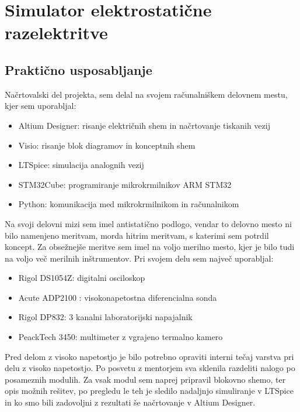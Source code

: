 \documentclass[a4paper,twoside,openright,12pt,Slovene]{book}
\begin{document}
\chapter{Simulator elektrostatične razelektritve} \label{ESDSIM}

	\section{Praktično usposabljanje}
	Načrtovalski del projekta, sem delal na svojem računalniškem delovnem mestu, kjer sem uporabljal:
	\begin{itemize}
		\item Altium Designer: risanje električnih shem in načrtovanje tiskanih vezij
		\item Visio: risanje blok diagramov in konceptnih shem
		\item LTSpice: simulacija analognih vezij
		\item STM32Cube: programiranje mikrokrmilnikov ARM STM32
		\item Python: komunikacija med mikrokrmilnikom in računalnikom
	\end{itemize}
	Na svoji delovni mizi sem imel antistatično podlogo, vendar to delovno mesto ni bilo namenjeno meritvam, morda hitrim meritvam, s katerimi sem potrdil koncept.
	Za obsežnejše meritve sem imel na voljo merilno mesto, kjer je bilo tudi na voljo več merilnih inštrumentov. Pri svojem delu sem največ uporabljal:
	\begin{itemize}
		\item Rigol DS1054Z: digitalni osciloskop
		\item Acute ADP2100 : visokonapetostna diferencialna sonda
		\item Rigol DP832: 3 kanalni laboratorijski napajalnik
		\item PeackTech 3450: multimeter z vgrajeno termalno kamero
	\end{itemize}
	Pred delom z visoko napetostjo je bilo potrebno opraviti interni tečaj varstva pri delu z visoko napetostjo. Po posvetu z mentorjem sva sklenila razdeliti nalogo po posameznih modulih. Za vsak modul sem naprej pripravil blokovno shemo, ter opis možnih rešitev, po pregledu le teh je sledilo nadaljnjo simuliranje v LTSpice in ko smo bili zadovoljni z rezultati še načrtovanje v Altium Designer.
	
\end{document}
